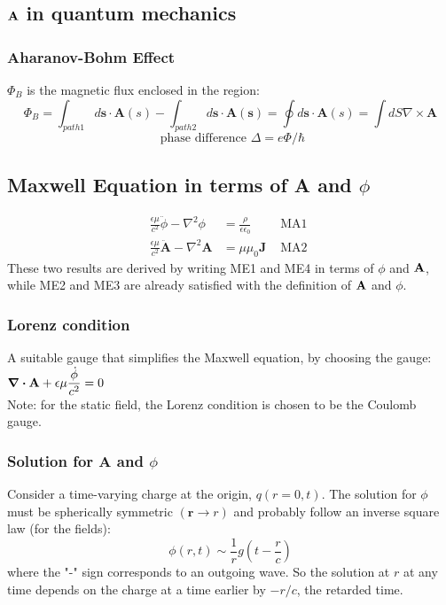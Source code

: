 \documentclass[12pt,a4paper]{article}
\begin{document}
\subsection{$\vb{A}$ in quantum mechanics}
\subsubsection{ Aharanov-Bohm Effect}
$\Phi_B$ is the magnetic flux enclosed in the region:
$$
\Phi_B=\int_{p a t h 1} d \boldsymbol{s} \cdot \boldsymbol{A}(s)-\int_{p a t h 2} d \boldsymbol{s} \cdot \boldsymbol{A}(\boldsymbol{s})=\oint d \boldsymbol{s} \cdot \boldsymbol{A}(s)=\int d S \nabla \times \boldsymbol{A}
$$
$$
\text { phase difference } \Delta=e \Phi / \hbar
$$
\subsection { Maxwell Equation in terms of A and $\phi$}
$$
\begin{array}{rlr}
\frac{\epsilon \mu}{c^2} \ddot{\phi}-\nabla^2 \phi & =\frac{\rho}{\epsilon \epsilon_0} & \text { MA1 } \\
\frac{\epsilon \mu}{c^2} \ddot{\boldsymbol{A}}-\nabla^2 \boldsymbol{A} & =\mu \mu_0 \boldsymbol{J} & \text { MA2 }
\end{array}
$$
These two results are derived by writing ME1 and ME4 in terms of $\phi$ and $\vb{A}$, while ME2 and ME3 are already satisfied with the definition of $\vb{A}$ and $\phi$.
\subsubsection {Lorenz condition}
A suitable gauge that simplifies the Maxwell equation, by choosing the gauge:
$\div \vb{A}+ \epsilon\mu \dfrac{\dot{\phi}}{c^2} = 0$\\
Note: for the static field, the Lorenz condition is chosen to be the Coulomb gauge.
\subsubsection {Solution for A and $\phi$}
Consider a time-varying charge at the origin, $q(r=0, t)$. The solution for $\phi$ must be spherically symmetric $(\boldsymbol{r} \rightarrow r)$ and probably follow an inverse square law (for the fields):
$$
\phi(r, t) \sim \frac{1}{r} g\left(t-\frac{r}{c}\right)
$$
where the "-" sign corresponds to an outgoing wave. So the solution at $r$ at any time depends on the charge at a time earlier by $-r / c$, the retarded time.
\end{document}
